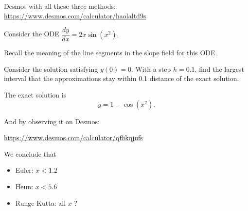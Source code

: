 \documentclass{workbook}
\begin{document}
\begin{slide}



Desmos with all these three methods:
\hfil 
\url{https://www.desmos.com/calculator/haolaltd9s}


Consider the ODE $\dfrac{dy}{dx} = 2x\sin(x^2)$.
\begin{parts}
	\item Recall the meaning of the line segments in the slope field for this ODE.

	\item Consider the solution satisfying $y(0)=0$. With a step $h=0.1$, find the largest interval that the approximations stay within 0.1 distance of the exact solution.

\end{parts}

	
\end{slide}




\begin{solution}
\begin{slide}

The exact solution is 
\[
y = 1 - \cos(x^2).
\]

And by observing it on Desmos: 
\begin{center}
	\url{https://www.desmos.com/calculator/qflikqjufs}
\end{center}

We conclude that
\begin{itemize}
	\item Euler: $x< 1.2$
	\item Heun: $x < 5.6$
	\item Runge-Kutta: all $x$ ?
\end{itemize}
	
\end{slide}
	
\end{solution}
\end{document}
